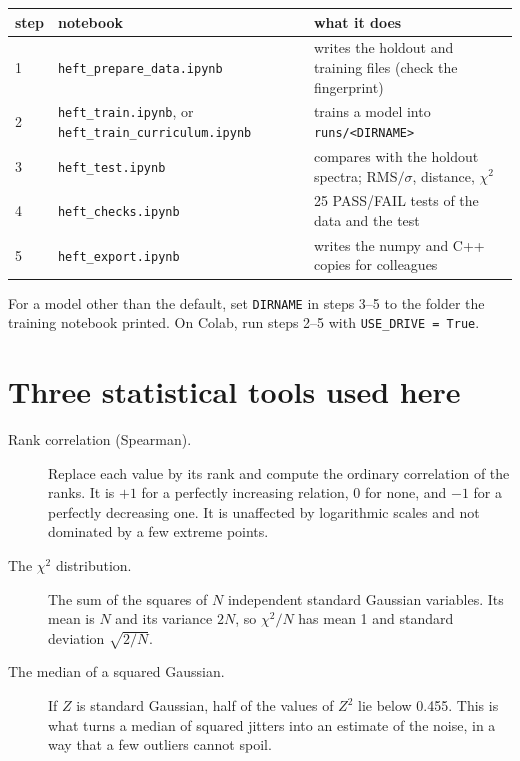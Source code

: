 \documentclass[11pt]{article}
\newcommand{\file}[1]{\nolinkurl{#1}}
\newcommand{\code}[1]{\texttt{#1}}
\begin{document}
\begin{center}
\small
\begin{tabular}{lp{}p{}}
\toprule
step & notebook & what it does\\
\midrule
1 & \file{heft_prepare_data.ipynb} & writes the holdout and training files (check the fingerprint)\\
2 & \file{heft_train.ipynb}, or \file{heft_train_curriculum.ipynb} & trains a model into \file{runs/<DIRNAME>}\\
3 & \file{heft_test.ipynb} & compares with the holdout spectra; RMS$/\sigma$, distance, $\chi^2$\\
4 & \file{heft_checks.ipynb} & 25 PASS/FAIL tests of the data and the test\\
5 & \file{heft_export.ipynb} & writes the numpy and C++ copies for colleagues\\
\bottomrule
\end{tabular}
\end{center}

For a model other than the default, set \code{DIRNAME} in steps 3--5 to the folder the
training notebook printed. On Colab, run steps 2--5 with \code{USE\_DRIVE = True}.

\section{Three statistical tools used here}

\begin{description}
  \item[Rank correlation (Spearman).] Replace each value by its rank and compute the
  ordinary correlation of the ranks. It is $+1$ for a perfectly increasing relation,
  0 for none, and $-1$ for a perfectly decreasing one. It is unaffected by logarithmic
  scales and not dominated by a few extreme points.
  \item[The $\chi^2$ distribution.] The sum of the squares of $N$ independent standard
  Gaussian variables. Its mean is $N$ and its variance $2N$, so $\chi^2/N$ has mean 1
  and standard deviation $\sqrt{2/N}$.
  \item[The median of a squared Gaussian.] If $Z$ is standard Gaussian, half of the
  values of $Z^2$ lie below 0.455. This is what turns a median of squared jitters into
  an estimate of the noise, in a way that a few outliers cannot spoil.
\end{description}
\end{document}
